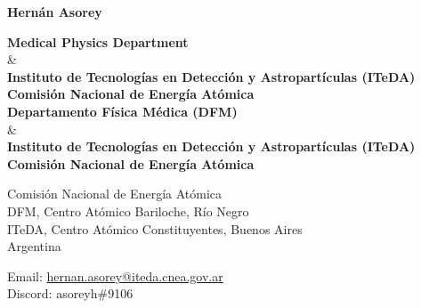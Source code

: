 \begin{center}{\huge \bf Hernán Asorey}\\[1cm]\end{center}

\begin{center}
\ifeng
	{\bf{Medical Physics Department}} \\
	\& \\
	{\bf{Instituto de Tecnologías en Detección y Astropartículas (ITeDA)}} \\
	{\bf{Comisión Nacional de Energía Atómica}}\\
\else
	{\bf{Departamento Física Médica (DFM)}} \\
	\& \\
	{\bf{Instituto de Tecnologías en Detección y Astropartículas (ITeDA)}} \\
	{\bf{Comisión Nacional de Energía Atómica}}\\
\fi
\end{center}
\begin{minipage}[t]{0.55\textwidth}
	Comisión Nacional de Energía Atómica\\
	DFM, Centro Atómico Bariloche, Río Negro\\
	ITeDA, Centro Atómico Constituyentes, Buenos Aires\\
	Argentina\\[.2cm]
\end{minipage}\hspace*{0.02\textwidth}
\begin{minipage}[t]{0.45\textwidth}
	Email: \href{mailto:hernan.asorey@iteda.cnea.gov.ar}{hernan.asorey@iteda.cnea.gov.ar}\\
	Discord: asoreyh\#9106\\
\end{minipage}

